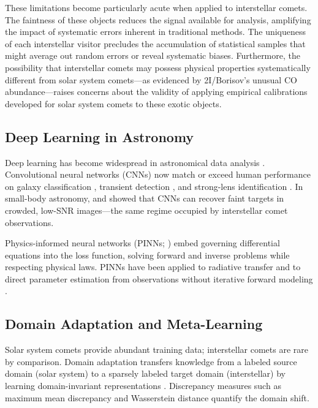 \documentclass[preprint2]{aastex631}
\begin{document}
These limitations become particularly acute when applied to interstellar comets. The faintness of these objects reduces the signal available for analysis, amplifying the impact of systematic errors inherent in traditional methods. The uniqueness of each interstellar visitor precludes the accumulation of statistical samples that might average out random errors or reveal systematic biases. Furthermore, the possibility that interstellar comets may possess physical properties systematically different from solar system comets---as evidenced by 2I/Borisov's unusual CO abundance---raises concerns about the validity of applying empirical calibrations developed for solar system comets to these exotic objects.

\subsection{Deep Learning in Astronomy}

Deep learning has become widespread in astronomical data analysis \citep{baron19}. Convolutional neural networks (CNNs) now match or exceed human performance on galaxy classification \citep{dieleman15}, transient detection \citep{goldstein15}, and strong-lens identification \citep{lanusse18}. In small-body astronomy, \citet{he26} and \citet{jiang23} showed that CNNs can recover faint targets in crowded, low-SNR images---the same regime occupied by interstellar comet observations.

Physics-informed neural networks (PINNs; \citealt{raissi19}) embed governing differential equations into the loss function, solving forward and inverse problems while respecting physical laws. PINNs have been applied to radiative transfer \citep{mishra21,biswal25} and to direct parameter estimation from observations without iterative forward modeling \citep{lu21}.

\subsection{Domain Adaptation and Meta-Learning}

Solar system comets provide abundant training data; interstellar comets are rare by comparison. Domain adaptation transfers knowledge from a labeled source domain (solar system) to a sparsely labeled target domain (interstellar) by learning domain-invariant representations \citep{daume09,ganin16}. Discrepancy measures such as maximum mean discrepancy \citep{gretton12} and Wasserstein distance \citep{arjovsky17} quantify the domain shift.
\end{document}
